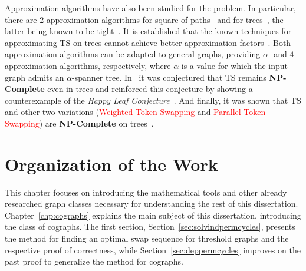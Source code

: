 \documentclass[msc,english,table,xcdraw]{ppgccufmg}
\begin{document}

Approximation algorithms have also been studied for the problem. In particular, there are 2-approximation algorithms for square of paths~\cite{Lenwood:2003} and for trees~\cite{Yamanaka:2015,Miltzow:2016}, the latter being known to be tight~\cite{Ahmad:2019}.
It is established that the known techniques for approximating TS on trees cannot achieve better approximation factors~\cite{Oswin:2021}.
Both approximation algorithms can be adapted to general graphs, providing $\alpha$- and $4$-approximation algorithms, respectively, where $\alpha$ is a value for which the input graph admits an $\alpha$-spanner tree.
In~\cite{Bonnet:2018} it was conjectured that TS remains \textbf{NP-Complete}
even in trees and \cite{Ahmad:2019} reinforced this conjecture by showing a counterexample of the \textit{Happy Leaf Conjecture}~\cite{Vaughan:1991}.
And finally, it was shown that TS and other two variations (\textcolor{red}{Weighted Token Swapping} and \textcolor{red}{Parallel Token Swapping}) are \textbf{NP-Complete} on trees~\cite{Oswin:2021}.


\section{Organization of the Work}
\label{sec:intro:organi}

This chapter focuses on introducing the mathematical tools and other 
already researched graph classes necessary for understanding the rest of this 
dissertation.
Chapter~\ref{chp:cographs} explains the main subject of this dissertation,
introducing the class of cographs.
The first section, Section~\ref{sec:solvindpermcycles}, presents the method 
for finding an optimal swap sequence for threshold graphs and the respective proof
of correctness, while Section~\ref{sec:deppermcycles} improves on the past 
proof to generalize the method for cographs.
\end{document}
